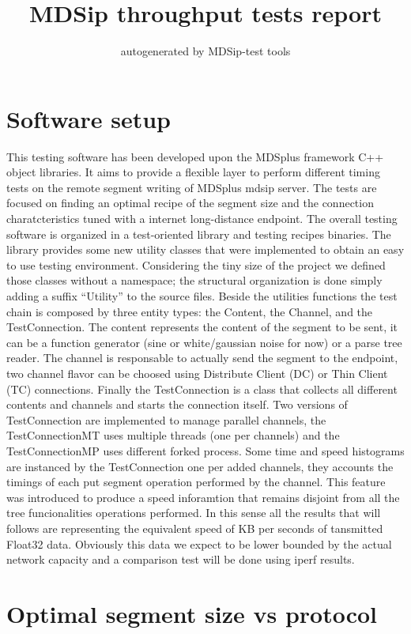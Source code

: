\documentclass[10pt,a4paper,draft]{article}
\author{autogenerated by MDSip-test tools}
\title{MDSip throughput tests report}
\begin{document}
\maketitle

\section{Software setup}

This testing software has been developed upon the MDSplus framework C++ object libraries. It aims to provide a flexible layer to perform different timing tests on the remote segment writing of MDSplus mdsip server.
The tests are focused on finding an optimal recipe of the segment size and the connection charatcteristics tuned with a internet long-distance endpoint.
The overall testing software is organized in a test-oriented library and testing recipes binaries. The library provides some new utility classes that were implemented to obtain an easy to use testing environment. 
Considering the tiny size of the project we defined those classes without a namespace; the structural organization is done simply adding a suffix “Utility” to the source files. 
Beside the utilities functions the test chain is composed by three entity types: the Content, the Channel, and the TestConnection. The content represents the content of the segment to be sent, it can be a function generator (sine or white/gaussian noise for now) or a parse tree reader. The channel is responsable to actually send the segment to the endpoint, two channel flavor can be choosed using Distribute Client (DC) or Thin Client (TC) connections. Finally the TestConnection is a class that collects all different contents and channels and starts the connection itself. Two versions of TestConnection are implemented to manage parallel channels, the TestConnectionMT uses multiple threads (one per channels) and the TestConnectionMP uses different forked process.
Some time and speed histograms are instanced by the TestConnection one per added channels, they accounts the timings of each put segment operation performed by the channel. This feature was introduced to produce a speed inforamtion that remains disjoint from all the tree funcionalities operations performed. In this sense all the results that will follows are representing the equivalent speed of KB per seconds of tansmitted Float32 data. Obviously this data we expect to be lower bounded by the actual network capacity and a comparison test will be done using iperf results.

\section{ Optimal segment size vs protocol }
\end{document}
